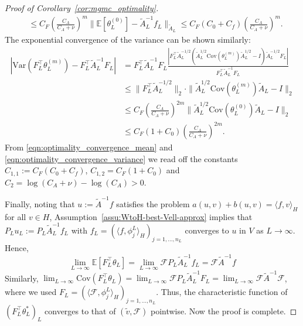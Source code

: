 \documentclass[11pt,english]{article}
\theoremstyle{plain}
\theoremstyle{plain}
\theoremstyle{plain}
\theoremstyle{plain}
\numberwithin{equation}{section}
\newcommand*{\id}{I}
\begin{document}
\begin{proof}[Proof of Corollary~\ref{cor:mgmc_optimality}]
\begin{equation}
\begin{aligned}
		&\leq C_F \left(\frac{C_A}{C_A+\nu}\right)^{m}\|\mathbb{E}[\theta_L^{(0)}]-\widetilde{A}_L^{-1}f_L\|_{\widetilde{A}_L}\le C_F (C_0+C_f)\left(\frac{C_A}{C_A+\nu}\right)^{m}.\label{eqn:optimality_convergence_mean}
	\end{aligned}
\end{equation}
	The exponential convergence of the variance can be shown similarly:
	\begin{equation}
	\begin{aligned}
		\left|\mathrm{Var}(F_L^\top\theta_{L}^{(m)})-F_L^\top\widetilde{A}_{L}^{-1}F_L\right| &= F_L^\top\widetilde{A}_L^{-1}F_L \frac{\left|F_L^\top\widetilde{A}_L^{-1/2}\left(\widetilde{A}_L^{1/2}\mathrm{Cov}(\theta_L^{(m)})\widetilde{A}_L^{1/2}-\id\right)\widetilde{A}_L^{-1/2}F_L\right|}{F_L^\top\widetilde{A}_L^{-1}F_L}\\
		&\leq \|F_L^\top \widetilde{A}_L^{-1/2}\|_2\cdot \|\widetilde{A}_L^{1/2}\mathrm{Cov}(\theta_L^{(m)})\widetilde{A}_L-\id\|_2\\
		&\leq C_F \left(\frac{C_A}{C_A+\nu}\right)^{2m}\|\widetilde{A}_L^{1/2}\mathrm{Cov}(\theta_L^{(0)})\widetilde{A}_L-\id\|_2\\
		&\le C_F(1+C_0) \left(\frac{C_A}{C_A+\nu}\right)^{2m}.\label{eqn:optimality_convergence_variance}
	\end{aligned}
\end{equation}
	From \eqref{eqn:optimality_convergence_mean} and \eqref{eqn:optimality_convergence_variance} we read off the constants $C_{1,1}:= C_F(C_0+C_f)$, $C_{1,2} = C_F(1+C_0)$ and $C_2 = \log(C_A+\nu)-\log(C_A)>0$. 
	
	Finally, noting that $u:=\widetilde{A}^{-1}f$ satisfies the problem $a(u,v)+b(u,v)=\langle f,v\rangle_{H}$
	for all $v\in H$, Assumption~\ref{assu:WtoH-best-Vell-approx} implies
	that $P_{L}u_{L}:=P_{L}\widetilde{A}_{L}^{-1}f_{L}$ with $f_{L}=(\langle f,\phi_{j}^{L}\rangle_{H})_{j=1,\dots,n_{L}}$
	converges to $u$ in $V$ as $L\to\infty$. Hence, 
	\[
	\lim_{L\to\infty}\mathbb{E}[F_{L}^{\top}\theta_{L}]=\lim_{L\to\infty}\mathcal{F}P_{L}\widetilde{A}_{L}^{-1}f_{L}=\mathcal{F}\widetilde{A}^{-1}f
	\]
	Similarly, $\lim_{L\to\infty}\mathrm{Cov}(F_{L}^{\top}\theta_{L})=\lim_{L\to\infty}\mathcal{F}P_{L}\widetilde{A}_{L}^{-1}F_{L}=\lim_{L\to\infty}\mathcal{F}\widetilde{A}^{-1}\mathcal{F}$, where we used $F_{L}=(\langle\mathcal{F},\phi_{j}^{L}\rangle_{H})_{j=1,\dots,n_{L}}$. 
	Thus, the characteristic function of $(F_{L}^{\top}\theta_{L}^{*})_{L}$
	converges to that of $(\widetilde{v},\mathcal{F})$ pointwise. Now
	the proof is complete.
\end{proof}
\end{document}
